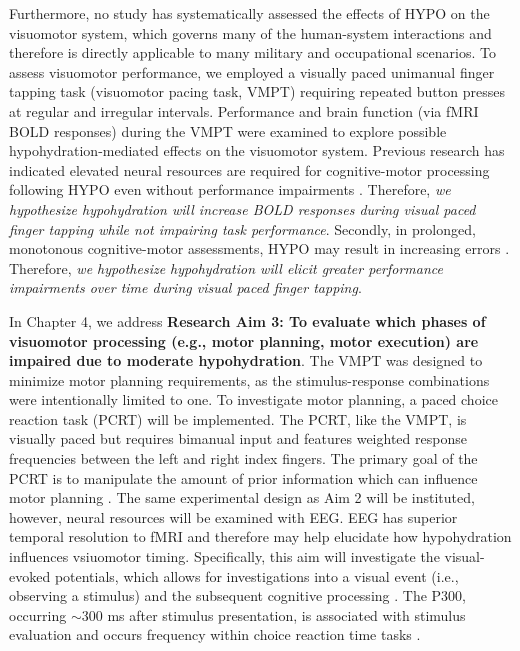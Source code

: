 Furthermore, no study has systematically assessed the effects of HYPO on the visuomotor system, which governs many of the human-system interactions \cite{buhusi_what_2005} and therefore is directly applicable to many military and occupational scenarios. To assess visuomotor performance, we employed a visually paced unimanual finger tapping task (visuomotor pacing task, VMPT) requiring repeated button presses at regular and irregular intervals. Performance and brain function (via fMRI BOLD responses) during the VMPT were examined to explore possible hypohydration-mediated effects on the visuomotor system. Previous research has indicated elevated neural resources are required for cognitive-motor processing following HYPO even without performance impairments \cite{kempton_dehydration_2011}. Therefore, \textit{we hypothesize hypohydration will increase BOLD responses during visual paced finger tapping while not impairing task performance}. Secondly, in prolonged, monotonous cognitive-motor assessments, HYPO may result in increasing errors \cite{watson_mild_2015}. Therefore, \textit{we hypothesize hypohydration will elicit greater performance impairments over time during visual paced finger tapping}.


In Chapter 4, we address \textbf{Research Aim 3: To evaluate which phases of visuomotor processing (e.g., motor planning, motor execution) are impaired due to moderate hypohydration}. The VMPT was designed to minimize motor planning requirements, as the stimulus-response combinations were intentionally limited to one. To investigate motor planning, a paced choice reaction task (PCRT) will be implemented. The PCRT, like the VMPT, is visually paced but requires bimanual input and features weighted response frequencies between the left and right index fingers. The primary goal of the PCRT is to manipulate the amount of prior information which can influence motor planning \cite{wong_motor_2015}. The same experimental design as Aim 2 will be instituted, however, neural resources will be examined with EEG. EEG has superior temporal resolution to fMRI \cite{mehta_neuroergonomics:_2013} and therefore may help elucidate how hypohydration influences vsiuomotor timing. Specifically, this aim will investigate the visual-evoked potentials, which allows for investigations into a visual event (i.e., observing a stimulus) and the subsequent cognitive processing \cite{park_making_2015,huang_neurophysiology_2015}. The P300, occurring ${\sim}$300 ms after stimulus presentation, is associated with stimulus evaluation \cite{park_making_2015} and occurs frequency within choice reaction time tasks \cite{miller_motor_2001}. 

